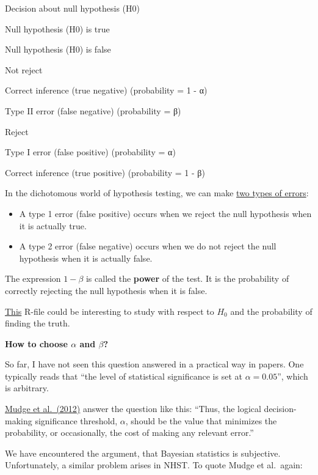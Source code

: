 \documentclass[
]{book}
\providecommand{\tightlist}{%
  \setlength{\itemsep}{0pt}\setlength{\parskip}{0pt}}
\begin{document}
Decision about null hypothesis (H0)

Null hypothesis (H0) is true

Null hypothesis (H0) is false

Not reject

Correct inference (true negative)
(probability = 1 - α)

Type II error (false negative)
(probability = β)

Reject

Type I error (false positive)
(probability = α)

Correct inference (true positive)
(probability = 1 - β)

In the dichotomous world of hypothesis testing, we can make \href{https://en.wikipedia.org/wiki/Type_I_and_type_II_errors}{two types of errors}:

\begin{itemize}
\tightlist
\item
  A type 1 error (false positive) occurs when we reject the null hypothesis when it is actually true.
\item
  A type 2 error (false negative) occurs when we do not reject the null hypothesis when it is actually false.
\end{itemize}

The expression \(1 - \beta\) is called the \textbf{power} of the test.
It is the probability of correctly rejecting the null hypothesis when it is false.

\href{https://github.com/jdegenfellner/ZHAW_Teaching/blob/main/H_0_and_the_truth.R}{This} R-file
could be interesting to study with respect to \(H_0\) and the probability of finding the truth.

\textbf{How to choose \(\alpha\) and \(\beta\)?}

So far, I have not seen this question answered in a practical way in papers.
One typically reads
that ``the level of statistical significance is set at \(\alpha = 0.05\)'', which is arbitrary.

\href{https://journals.plos.org/plosone/article?id=10.1371/journal.pone.0032734}{Mudge et al.~(2012)}
answer the question like this:
``Thus, the logical decision-making significance threshold, \(\alpha\),
should be the value that minimizes the probability, or occasionally,
the cost of making any relevant error.''

We have encountered the argument, that Bayesian statistics is subjective.
Unfortunately, a similar problem arises in NHST. To quote Mudge et al.~again:
\end{document}
